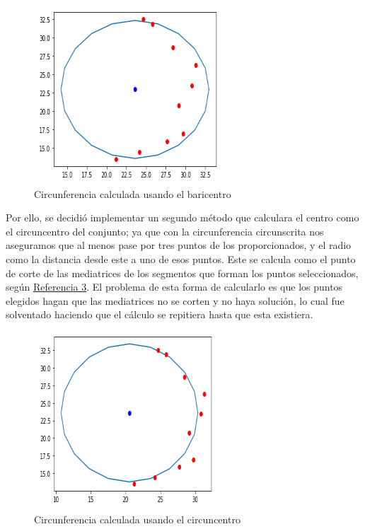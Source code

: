 \documentclass[conference,a4paper]{IEEEtran}
\begin{document}
\begin{figure}[H]
\centering
\includegraphics[scale=0.8]{ArcoBaricentroResultado}
\caption{Circunferencia calculada usando el baricentro}
\end{figure}

Por ello, se decidió implementar un segundo método que calculara el centro como el circuncentro del conjunto; ya que con la circunferencia circunscrita nos aseguramos que al menos pase por tres puntos de los proporcionados, y el radio como la distancia desde este a uno de esos puntos. Este se calcula como el punto de corte de las mediatrices de los segmentos que forman los puntos seleccionados, según \hyperref[bib:georgeSeif2]{Referencia 3}. El problema de esta forma de calcularlo es que los puntos elegidos hagan que las mediatrices no se corten y no haya solución, lo cual fue solventado haciendo que el cálculo se repitiera hasta que esta existiera.

\begin{figure}[H]
\centering
\includegraphics[scale=0.8]{ArcoCircuncentroResultado}
\caption{Circunferencia calculada usando el circuncentro}
\end{figure}
\end{document}
